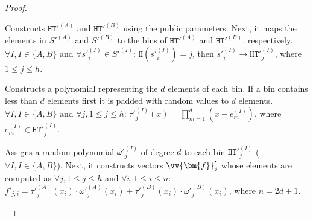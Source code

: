 \begin{proof}
\begin{packed_enum}
\item Constructs  $\mathtt{HT}'^{\scriptscriptstyle(A)}$ and $\mathtt{HT}'^{\scriptscriptstyle(B)}$ using the public parameters. Next, it maps the elements in  $S'^{\scriptscriptstyle (A)}$ and $S'^{\scriptscriptstyle (B)}$ to the bins of $\mathtt{HT}'^{\scriptscriptstyle(A)}$ and $\mathtt{HT}'^{\scriptscriptstyle(B)}$, respectively. $\forall I, I\in \{A,B\}$ and $\forall s'^{\scriptscriptstyle (I)}_{\scriptscriptstyle i}\in S'^{\scriptscriptstyle (I)}$: $\mathtt{H}( s'^{\scriptscriptstyle (I)}_{\scriptscriptstyle i})=j$, then $ s'^{\scriptscriptstyle (I)}_{\scriptscriptstyle i}\rightarrow \mathtt{HT}'^{\scriptscriptstyle (I)}_{\scriptscriptstyle j}$, where $1\leq j \leq h$.


\item Constructs  a polynomial representing the $d$ elements of each bin. If a bin contains less than $d$ elements first it is  padded with random values  to $d$ elements. $\forall I, I\in \{A,B\}$ and $\forall j, 1\leq j \leq h$: $\tau'^{\scriptscriptstyle (I)}_{\scriptscriptstyle j}(x)=\prod\limits ^{\scriptscriptstyle d}_{\scriptscriptstyle m=1}(x-e_{\scriptscriptstyle m}^{\scriptscriptstyle (I)})$, where $e^{\scriptscriptstyle (I)}_{\scriptscriptstyle m} \in \mathtt{HT}'^{\scriptscriptstyle (I)}_{\scriptscriptstyle j}$.


\item Assigns a random polynomial $\omega'^{\scriptscriptstyle (I)}_{\scriptscriptstyle j}$ of degree $d$ to each bin $\mathtt{HT}'^{\scriptscriptstyle (I)}_{\scriptscriptstyle j}$ ( $\forall I, I \in \{A,B\}$). Next, it constructs  vectors $\vv{\bm{f}}'_{\scriptscriptstyle j}$ whose elements are computed as $\forall j, 1\leq j\leq h$ and $\forall i, 1\leq i\leq n$: $f'_{\scriptscriptstyle j,i}=\tau'^{\scriptscriptstyle (A)}_{\scriptscriptstyle j}(x_{\scriptscriptstyle i})\cdot  \omega'^{\scriptscriptstyle (A)}_{\scriptscriptstyle j}(x_{\scriptscriptstyle i})+\tau'^{\scriptscriptstyle (B)}_{\scriptscriptstyle j}(x_{\scriptscriptstyle i})\cdot  \omega'^{\scriptscriptstyle (B)}_{\scriptscriptstyle j}(x_{\scriptscriptstyle i})$, where $n=2d+1$.




\end{packed_enum}
\end{proof}
